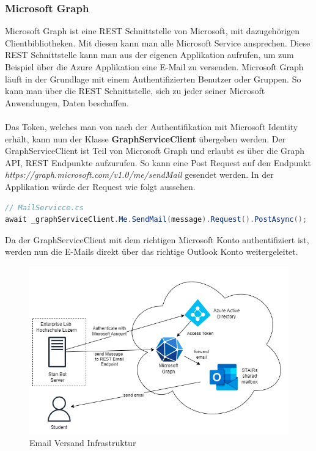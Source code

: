 \documentclass[a4paper, table]{article}
\begin{document}
\subsubsection*{Microsoft Graph}
Microsoft Graph ist eine REST Schnittstelle von Microsoft, mit dazugehörigen Clientbibliotheken.
Mit diesen kann man alle Microsoft Service ansprechen. \autocite{angelgolfer-ms_microsoft_nodate}
Diese REST Schnittstelle kann man aus der eigenen Applikation aufrufen, um zum Beispiel über die Azure Applikation eine E-Mail zu versenden.
Microsoft Graph läuft in der Grundlage mit einem Authentifizierten Benutzer oder Gruppen.
So kann man über die REST Schnittstelle, sich zu jeder seiner Microsoft Anwendungen, Daten beschaffen.\\\\
Das Token, welches man von nach der Authentifikation mit Microsoft Identity erhält, kann nun der Klasse \textbf{GraphServiceClient} übergeben werden.
Der GraphServiceClient ist Teil von Microsoft Graph und erlaubt es über die Graph API, REST Endpunkte aufzurufen.
So kann eine Post Request auf den Endpunkt \textit{https://graph.microsoft.com/v1.0/me/sendMail} gesendet werden.
In der Applikation würde der Request wie folgt aussehen.

\begin{lstlisting}[language=csharp]
// MailServicce.cs
await _graphServiceClient.Me.SendMail(message).Request().PostAsync();
\end{lstlisting}

Da der GraphServiceClient mit dem richtigen Microsoft Konto authentifiziert ist, 
werden nun die E-Mails direkt über das richtige Outlook Konto weitergeleitet.

\begin{figure}[h]
    \centering
    \includegraphics[width=1\textwidth]{img/Email_Infrastruktur.png}
    \caption{Email Versand Infrastruktur}
    \label{fig:send-email-infrastructure}
\end{figure}
\end{document}
